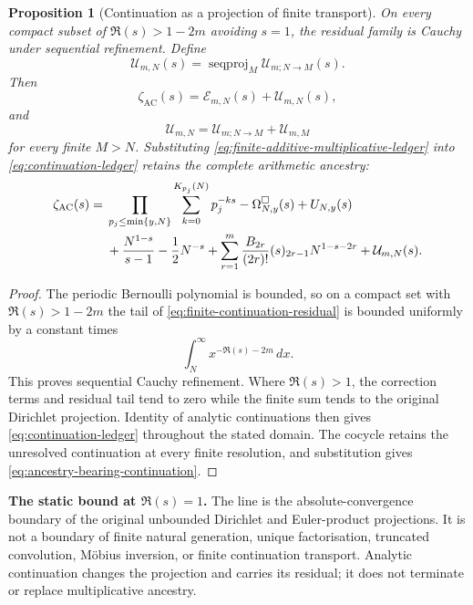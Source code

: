 \documentclass[11pt,a4paper]{article}
\newtheorem{proposition}[theorem]{Proposition}
\theoremstyle{definition}
\newcommand{\Continuation}{\mathcal{E}}
\newcommand{\SeqProj}{\operatorname{seqproj}}
\begin{document}
\begin{proposition}[Continuation as a projection of finite transport]
\label{prop:continuation-projection}
On every compact subset of $\Re(s)>1-2m$ avoiding $s=1$, the residual family
is Cauchy under sequential refinement. Define
\[
  \mathcal U_{m,N}(s)
  =
  \SeqProj_{M}
  \mathcal U_{m;N\to M}(s).
\]
Then
\begin{equation}
\label{eq:continuation-ledger}
  \zeta_{\mathrm{AC}}(s)
  =
  \Continuation_{m,N}(s)+\mathcal U_{m,N}(s),
\end{equation}
and
\[
  \mathcal U_{m,N}
  =
  \mathcal U_{m;N\to M}+\mathcal U_{m,M}
\]
for every finite $M>N$. Substituting
\cref{eq:finite-additive-multiplicative-ledger} into
\cref{eq:continuation-ledger} retains the complete arithmetic ancestry:
\begin{align}
\zeta_{\mathrm{AC}}(s)
={}&
\prod_{p_j\leq\min\{y,N\}}
\sum_{k=0}^{K_{p_j}(N)}p_j^{-ks}
-\Omega^\Box_{N,y}(s)+U_{N,y}(s)\notag\\
&+\frac{N^{1-s}}{s-1}-\frac12N^{-s}
+\sum_{r=1}^{m}
\frac{B_{2r}}{(2r)!}(s)_{2r-1}N^{1-s-2r}
+\mathcal U_{m,N}(s).
\label{eq:ancestry-bearing-continuation}
\end{align}
\end{proposition}

\begin{proof}
The periodic Bernoulli polynomial is bounded, so on a compact set with
$\Re(s)>1-2m$ the tail of
\cref{eq:finite-continuation-residual} is bounded uniformly by a constant
times
\[
  \int_N^\infty x^{-\Re(s)-2m}\,dx.
\]
This proves sequential Cauchy refinement. Where $\Re(s)>1$, the correction
terms and residual tail tend to zero while the finite sum tends to the original
Dirichlet projection. Identity of analytic continuations then gives
\cref{eq:continuation-ledger} throughout the stated domain. The cocycle retains
the unresolved continuation at every finite resolution, and substitution gives
\cref{eq:ancestry-bearing-continuation}.
\end{proof}

\begin{reviewbox}
\textbf{The static bound at $\Re(s)=1$.}
The line is the absolute-convergence boundary of the original unbounded
Dirichlet and Euler-product projections. It is not a boundary of finite natural
generation, unique factorisation, truncated convolution, Möbius inversion, or
finite continuation transport. Analytic continuation changes the projection
and carries its residual; it does not terminate or replace multiplicative
ancestry.
\end{reviewbox}
\end{document}
